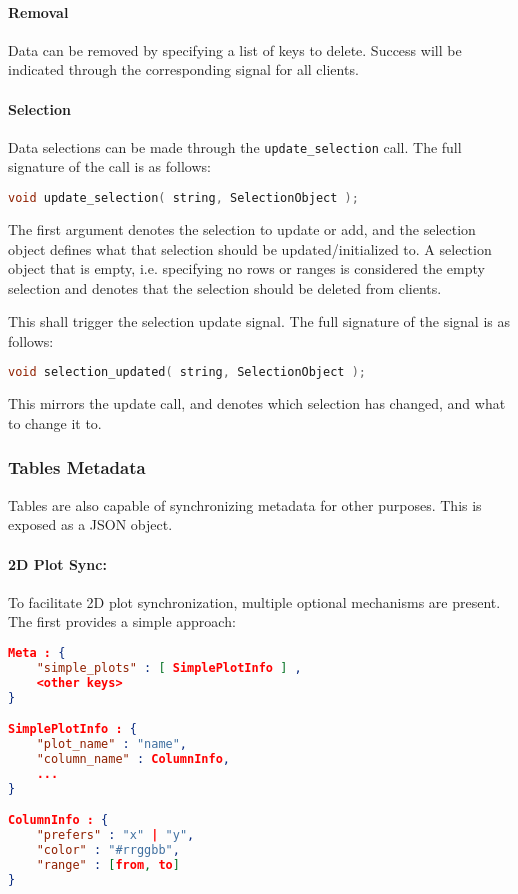 \documentclass[11pt, oneside]{amsart}
\begin{document}
\paragraph{\textbf{Removal}} Data can be removed by specifying a list of keys to delete. Success will be indicated through the corresponding signal for all clients.

\paragraph{\textbf{Selection}} Data selections can be made through the \texttt{update\_selection} call. The full signature of the call is as follows:

\begin{lstlisting}[language=c++]
	void update_selection( string, SelectionObject );
\end{lstlisting}

The first argument denotes the selection to update or add, and the selection object defines what that selection should be updated/initialized to. A selection object that is empty, i.e. specifying no rows or ranges is considered the empty selection and denotes that the selection should be deleted from clients.

This shall trigger the selection update signal. The full signature of the signal is as follows:

\begin{lstlisting}[language=c++]
	void selection_updated( string, SelectionObject );
\end{lstlisting}

This mirrors the update call, and denotes which selection has changed, and what to change it to.

\subsubsection{Tables Metadata}

Tables are also capable of synchronizing metadata for other purposes. This is exposed as a JSON object.

\paragraph{2D Plot Sync:} To facilitate 2D plot synchronization, multiple optional mechanisms are present. The first provides a simple approach:

\begin{lstlisting}[language=json, label=listing:simple_sync_meta, caption=Table Metadata for Plot Sync ]
Meta : {
	"simple_plots" : [ SimplePlotInfo ] ,
	<other keys>
}

SimplePlotInfo : {
	"plot_name" : "name",
	"column_name" : ColumnInfo,
	...
}

ColumnInfo : {
	"prefers" : "x" | "y",
	"color" : "#rrggbb",
	"range" : [from, to]
}
\end{lstlisting}
\end{document}
